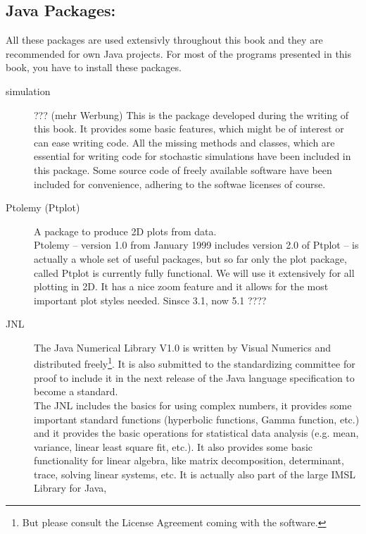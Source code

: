 \subsection{Java Packages:}
All these packages are used extensivly throughout this book and they
are recommended for own Java projects. For most of the programs
presented in this book, you have to install these packages.
\begin{description}
\item[simulation]  ??? (mehr Werbung)
  This is the package developed during the writing
        of this book. It provides some basic features, which
        might be of interest or can ease writing code. All the missing
        methods and classes, which are essential for writing code
        for stochastic simulations have been included in this package.
        Some source
        code of freely available software have been included for
        convenience, adhering to the softwae licenses of course. 
\item[Ptolemy (Ptplot)]  
  A package to produce 2D plots from data. \\
        Ptolemy -- version 1.0 from January 1999 includes version
        2.0 of Ptplot --
        is actually a whole set of useful packages, but so far only the
        plot package, called Ptplot is currently fully functional. We will
        use it extensively for all plotting in 2D. It has a nice
        zoom feature and it allows for the most important plot styles
        needed.
 	Sinsce 3.1, now 5.1 ????
\item[JNL]  
  The Java Numerical Library V1.0 is written by Visual Numerics and
        distributed freely\footnote{But please consult the License Agreement
        coming with the software.}. It is also submitted to the standardizing
        committee for proof to include it in the next release of the
        Java language specification to become a standard. \\
        The JNL includes the basics for using complex numbers, it
        provides some important standard functions (hyperbolic
        functions, Gamma function, etc.) and it provides 
        the basic operations for statistical data analysis (e.g. mean,
        variance, linear least square fit, etc.). It also provides some
        basic functionality for linear algebra, like matrix decomposition,
        determinant, trace, solving linear systems, etc.
        It is actually also part of the large IMSL Library for Java,

\end{description}
